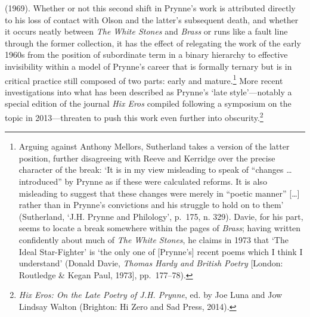 \documentclass[]{article}
\begin{document}
(1969). Whether or not this second shift in Prynne’s work is attributed
directly to his loss of contact with Olson and the latter’s subsequent
death, and whether it occurs neatly between \emph{The White Stones} and
\emph{Brass} or runs like a fault line through the former collection, it
has the effect of relegating the work of the early 1960s from the
position of subordinate term in a binary hierarchy to effective
invisibility within a model of Prynne’s career that is formally ternary
but is in critical practice still composed of two parts: early and
mature.\footnote{Arguing against Anthony Mellors, Sutherland takes a
  version of the latter position, further disagreeing with Reeve and
  Kerridge over the precise character of the break: ‘It is in my view
  misleading to speak of “changes \ldots{} introduced” by Prynne as if
  these were calculated reforms. It is also misleading to suggest that
  these changes were merely in “poetic manner” {[}\ldots{}{]} rather
  than in Prynne’s convictions and his struggle to hold on to them’
  (Sutherland, ‘J.H. Prynne and Philology’, p.~175, n. 329). Davie, for
  his part, seems to locate a break somewhere within the pages of
  \emph{Brass}; having written confidently about much of \emph{The White
  Stones}, he claims in 1973 that ‘The Ideal Star-Fighter’ is ‘the only
  one of {[}Prynne’s{]} recent poems which I think I understand’ (Donald
  Davie, \emph{Thomas Hardy and British Poetry} {[}London: Routledge \&
  Kegan Paul, 1973{]}, pp.~177–78).} More recent investigations into
what has been described as Prynne’s ‘late style’—notably a special
edition of the journal \emph{Hix Eros} compiled following a symposium on
the topic in 2013—threaten to push this work even further into
obscurity.\footnote{\emph{Hix Eros: On the Late Poetry of J.H. Prynne},
  ed. by Joe Luna and Jow Lindsay Walton (Brighton: Hi Zero and Sad
  Press, 2014).}
\end{document}
